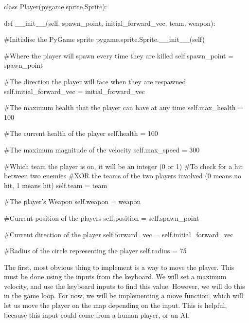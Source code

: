 \begin{mpy}
class Player(pygame.sprite.Sprite):

    def __init__(self, spawn_point, initial_forward_vec, team, weapon):

        #Initialise the PyGame sprite
        pygame.sprite.Sprite.__init__(self)

        #Where the player will spawn every time they are killed
        self.spawn_point = spawn_point

        #The direction the player will face when they are respawned
        self.initial_forward_vec = initial_forward_vec

        #The maximum health that the player can have at any time
        self.max_health = 100

        #The current health of the player
        self.health = 100

        #The maximum magnitude of the velocity
        self.max_speed = 300

        #Which team the player is on, it will be an integer (0 or 1)
        #To check for a hit between two enemies
        #XOR the teams of the two players involved (0 means no hit, 1 means hit)
        self.team = team

        #The player's Weapon
        self.weapon = weapon

        #Current position of the players
        self.position = self.spawn_point

        #Current direction of the player
        self.forward_vec = self.initial_forward_vec

        #Radius of the circle representing the player
        self.radius = 75
\end{mpy}
\vs
The first, most obvious thing to implement is a way to move the player. This must be done using the inputs from the keyboard. We will set a maximum velocity, and use the keyboard inputs to find this value. However, we will do this in the game loop. For now, we will be implementing a move function, which will let us move the player on the map depending on the input. This is helpful, because this input could come from a human player, or an AI.
\vs

